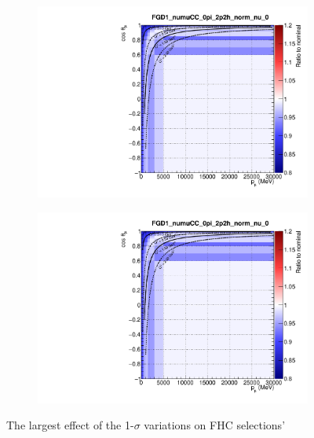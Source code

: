 \begin{figure}[h]
\begin{subfigure}[t]{0.24\textwidth}
\includegraphics[width=\textwidth,page=11]{figures/mach3/sigmavar/Full_1sigmaVar_18July_BeRPA_U_ND280_sigmavar_highest_all}
\end{subfigure}
\begin{subfigure}[t]{0.24\textwidth}
\includegraphics[width=\textwidth,page=12]{figures/mach3/sigmavar/Full_1sigmaVar_18July_BeRPA_U_ND280_sigmavar_highest_all}
\end{subfigure}
\caption{The largest effect of the 1-$\sigma$ variations on FHC selections' \pmu \cosmu}
\label{fig:onesigma_fhc}
\end{figure}

